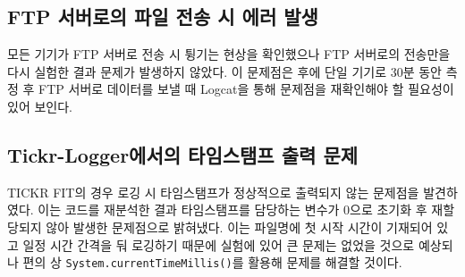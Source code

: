 \documentclass[11pt]{article}
\begin{document}
    \subsection*{FTP 서버로의 파일 전송 시 에러 발생}
    모든 기기가 FTP 서버로 전송 시 튕기는 현상을 확인했으나 
    FTP 서버로의 전송만을 다시 실험한 결과 문제가 발생하지 않았다.
    이 문제점은 후에 단일 기기로 30분 동안 측정 후 FTP 서버로 데이터를 보낼 때
    Logcat을 통해 문제점을 재확인해야 할 필요성이 있어 보인다.
    \subsection*{Tickr-Logger에서의 타임스탬프 출력 문제}
    TICKR FIT의 경우 로깅 시 타임스탬프가 정상적으로 출력되지 않는 문제점을 발견하였다.
    이는 코드를 재분석한 결과 타임스탬프를 담당하는 변수가 0으로 초기화 후 
    재할당되지 않아 발생한 문제점으로 밝혀냈다. 이는 파일명에 첫 시작 시간이 기재되어 있고
    일정 시간 간격을 둬 로깅하기 때문에 실험에 있어 큰 문제는 없었을 것으로 예상되나
    편의 상 \texttt{System.currentTimeMillis()}를 활용해 문제를 해결할 것이다.
\end{document}
